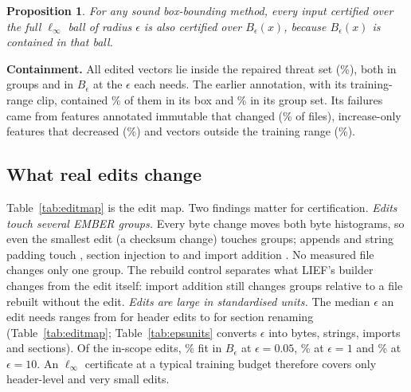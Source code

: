 \documentclass[preprint,12pt,authoryear]{elsarticle}
\newtheorem{proposition}{Proposition}
\begin{document}
\begin{proposition}\label{prop:box}
For any sound box-bounding method, every input certified over the full $\ell_\infty$ ball of radius $\epsilon$ is also certified over $B_\epsilon(x)$, because $B_\epsilon(x)$ is contained in that ball.
\end{proposition}

\textbf{Containment.} All \PsNEditedInScope{} edited vectors lie inside the repaired threat set (\PsRepairedInsidePct\%), both in groups and in $B_\epsilon$ at the $\epsilon$ each needs. The earlier annotation, with its training-range clip, contained \PsDraftBoxInsidePct\% of them in its box and \PsDraftGroupInsidePct\% in its group set. Its failures came from features annotated immutable that changed (\PsDraftImmutableChangedPct\% of files), increase-only features that decreased (\PsDraftMonotoneDecreasedPct\%) and vectors outside the training range (\PsDraftOutsideRangePct\%).

\subsection{What real edits change}\label{sec:editmap}
Table~\ref{tab:editmap} is the edit map. Two findings matter for certification. \emph{Edits touch several EMBER groups.} Every byte change moves both byte histograms, so even the smallest edit (a checksum change) touches \PsEsevenGroupsMed{} groups; appends and string padding touch \PsEoneGroupsMed, section injection \PsEthreeGroupsMed{} to \PsEthreeGroupsMax{} and import addition \PsEfourGroupsMed. No measured file changes only one group. The rebuild control separates what LIEF's builder changes from the edit itself: import addition still changes \PsEfourOwnGroupsMed{} groups relative to a file rebuilt without the edit. \emph{Edits are large in standardised units.} The median $\epsilon$ an edit needs ranges from \PsEsevenEpsMed{} for header edits to \PsEsixEpsMed{} for section renaming (Table~\ref{tab:editmap}; Table~\ref{tab:epsunits} converts $\epsilon$ into bytes, strings, imports and sections). Of the in-scope edits, \PsEpsLeTrainPct\% fit in $B_\epsilon$ at $\epsilon=0.05$, \PsEpsLeOnePct\% at $\epsilon=1$ and \PsEpsLeTenPct\% at $\epsilon=10$. An $\ell_\infty$ certificate at a typical training budget therefore covers only header-level and very small edits.

\begin{table}[!htbp]
\centering\small
\caption{Edit map over the \PsNEditedInScope{} in-scope edited files of the \PsNFiles-file corpus: share of files in which each EMBER group changes, number of groups changed, $\epsilon$ needed in standardised units, and share of files inside the draft threat set. E9 (UPX) is out of scope; E0 is the LIEF rebuild control.}\label{tab:editmap}
\resizebox{\textwidth}{!}{}
\end{table}
\end{document}
